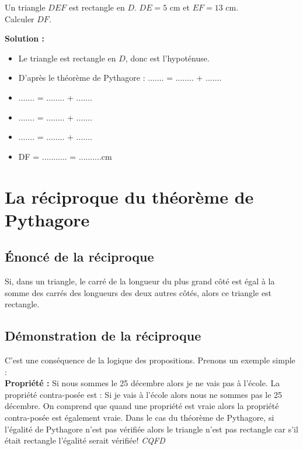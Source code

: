\begin{examplebox}
Un triangle $DEF$ est rectangle en $D$. $DE = 5$ cm et $EF = 13$ cm.\\
Calculer $DF$.

\textbf{Solution :}
\begin{itemize}
    \item Le triangle est rectangle en $D$, donc \trous{1.5cm} est l'hypoténuse.
    \item D'après le théorème de Pythagore : ....... = ........ + .......
    \item ....... = ........ + .......
    \item ....... = ........ + .......
    \item ....... = ........ + .......
    \item DF = ........... = ..........cm
\end{itemize}
\end{examplebox}

\section{La réciproque du théorème de Pythagore}

\subsection{Énoncé de la réciproque}

\begin{theoremebox}
Si, dans un triangle, le carré de la longueur du plus grand côté est égal à la somme des carrés des longueurs des deux autres côtés, alors ce triangle est rectangle.
\end{theoremebox}

\subsection{Démonstration de la réciproque}
C’est une conséquence de la logique des propositions. Prenons un exemple simple :\\
\textbf{Propriété :} Si nous sommes le 25 décembre alors je ne vais pas à l’école. La propriété contra-posée est : Si je vais à l'école alors nous ne sommes pas le 25 décembre. On comprend que quand une propriété est vraie alors la propriété contra-posée est également vraie. Dans le cas du théorème de Pythagore, si l’égalité de Pythagore n’est pas vérifiée alors le triangle n’est pas rectangle car s’il était rectangle l’égalité serait vérifiée! \qquad \textit{CQFD}

